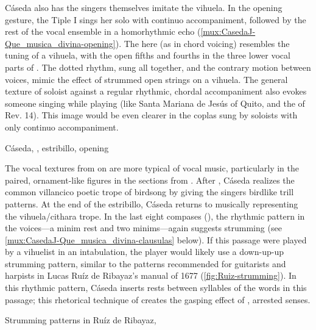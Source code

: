 Cáseda also has the singers themselves imitate the vihuela.
In the opening gesture, the Tiple I sings her solo with continuo accompaniment,
followed by the rest of the vocal ensemble in a homorhythmic echo
(\cref{mux:CasedaJ-Que_musica_divina-opening}).
The  here (as in chord voicing) resembles the tuning of a
vihuela, with the open fifths and fourths in the three lower vocal parts of
.
The dotted rhythm, sung all together, and the contrary motion between voices,
mimic the effect of strummed open strings on a vihuela.
The general texture of soloist against a regular rhythmic, chordal
accompaniment also evokes someone singing while playing (like Santa Mariana de
Jesús of Quito, and the  of Rev. 14).
This image would be even clearer in the coplas sung by soloists with only
continuo accompaniment.

{Cáseda, , estribillo, opening}


The vocal textures from  on are more typical of vocal music,
particularly in the paired, ornament-like figures in the sections from
.
After , Cáseda realizes the common villancico poetic trope of
birdsong by giving the singers birdlike trill patterns. 
At the end of the estribillo, Cáseda returns to musically representing the
vihuela/cithara trope.
In the last eight compases (), the rhythmic pattern in the
voices---a minim rest and two minims---again suggests strumming (see
\cref{mux:CasedaJ-Que_musica_divina-clausulas} below).
If this passage were played by a vihuelist in an intabulation, the player would
likely use a down-up-up strumming pattern, similar to the patterns recommended
for guitarists and harpists in Lucas Ruíz de Ribayaz's manual  of 1677 (\cref{fig:Ruiz-strumming}).%
    \Autocite[9]{Ruiz:Luz}
In this rhythmic pattern, Cáseda inserts rests between syllables of the words
in this passage; this rhetorical technique of  creates the
gasping effect of , arrested senses.

{Strumming patterns in Ruíz de Ribayaz, }

